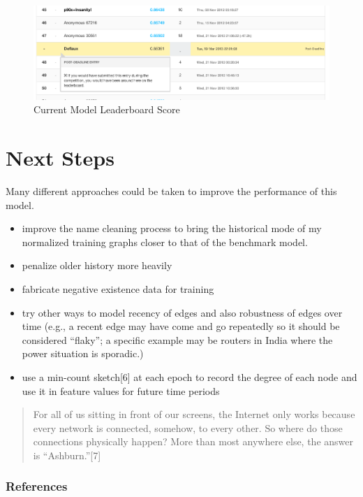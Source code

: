\documentclass{article} %
\begin{document}
\begin{figure}
  \begin{center}
    \includegraphics[scale=.4]{leaderboard.png}
  \end{center}
  \caption{Current Model Leaderboard Score}
\end{figure}

\section{Next Steps}

Many different approaches could be taken to improve the performance of this model.

\begin{itemize}
\item improve the name cleaning process to bring the historical mode of my
  normalized training graphs closer to that of the benchmark model.
\item penalize older history more heavily
\item fabricate negative existence data for training
\item try other ways to model recency of edges and also robustness
  of edges over time  (e.g., a recent edge may have come and go repeatedly so it
  should be considered ``flaky''; a specific example may be routers in India
  where the power situation is sporadic.)
\item use a min-count sketch[6] at each epoch to record the degree of each
node and use it in feature values for future time periods 
\end{itemize}

\begin{quote}
For all of us sitting in front of our screens, the Internet only works
because every network is connected, somehow, to every other. So where do
those connections physically happen? More than most anywhere else, the
answer is ``Ashburn.''[7]  
\end{quote}

\subsubsection*{References}
\end{document}
